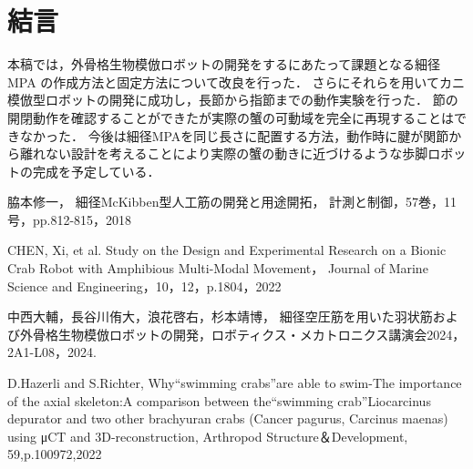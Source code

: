 \documentclass{jarticle}
\begin{document}
\section{結言}
本稿では，外骨格生物模倣ロボットの開発をするにあたって課題となる細径MPA の作成方法と固定方法について改良を行った．
さらにそれらを用いてカニ模倣型ロボットの開発に成功し，長節から指節までの動作実験を行った．
節の開閉動作を確認することができたが実際の蟹の可動域を完全に再現することはできなかった．
今後は細径MPAを同じ長さに配置する方法，動作時に腱が関節から離れない設計を考えることにより実際の蟹の動きに近づけるような歩脚ロボットの完成を予定している．

\begin{thebibliography}{99}
  脇本修一，
  細径McKibben型人工筋の開発と用途開拓，
  計測と制御，57巻，11号，pp.812-815，2018
  
  CHEN, Xi, et al. Study on the Design and Experimental Research on a Bionic Crab Robot with Amphibious Multi-Modal Movement， Journal of Marine Science and Engineering，10，12，p.1804，2022
  
  中西大輔，長谷川侑大，浪花啓右，杉本靖博，
  細径空圧筋を用いた羽状筋および外骨格生物模倣ロボットの開発，ロボティクス・メカトロニクス講演会2024，2A1-L08，2024.

  D.Hazerli and S.Richter,
  Why“swimming crabs”are able to swim-The importance of the axial skeleton:A comparison between the“swimming crab”Liocarcinus depurator and two other brachyuran crabs (Cancer pagurus, Carcinus maenas) using μCT and 3D-reconstruction,
  Arthropod Structure＆Development,
  59,p.100972,2022

 \end{thebibliography}
\end{document}
